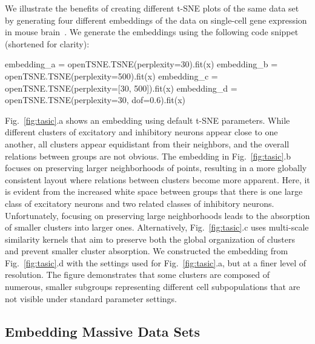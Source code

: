 \documentclass[article]{jss}
\begin{document}
We illustrate the benefits of creating different t-SNE plots of the same data set by generating four different embeddings of the data on single-cell gene expression in mouse brain~\citep{tasic2018shared}. We generate the embeddings using the following code snippet (shortened for clarity):
\begin{CodeChunk}
\begin{CodeInput}
embedding_a = openTSNE.TSNE(perplexity=30).fit(x)
embedding_b = openTSNE.TSNE(perplexity=500).fit(x)
embedding_c = openTSNE.TSNE(perplexity=[30, 500]).fit(x)
embedding_d = openTSNE.TSNE(perplexity=30, dof=0.6).fit(x)
\end{CodeInput}
\end{CodeChunk}
Fig.~\ref{fig:tasic}.a shows an embedding using default t-SNE parameters. While different clusters of excitatory and inhibitory neurons appear close to one another, all clusters appear equidistant from their neighbors, and the overall relations between groups are not obvious. The embedding in Fig.~\ref{fig:tasic}.b focuses on preserving larger neighborhoods of points, resulting in a more globally consistent layout where relations between clusters become more apparent. Here, it is evident from the increased white space between groups that there is one large class of excitatory neurons and two related classes of inhibitory neurons. Unfortunately, focusing on preserving large neighborhoods leads to the absorption of smaller clusters into larger ones. Alternatively, Fig.~\ref{fig:tasic}.c uses multi-scale similarity kernels that aim to preserve both the global organization of clusters and prevent smaller cluster absorption. We constructed the embedding from Fig.~\ref{fig:tasic}.d with the settings used for Fig.~\ref{fig:tasic}.a, but at a finer level of resolution. The figure demonstrates that some clusters are composed of numerous, smaller subgroups representing different cell subpopulations that are not visible under standard parameter settings.

\subsection{Embedding Massive Data Sets}
\end{document}
